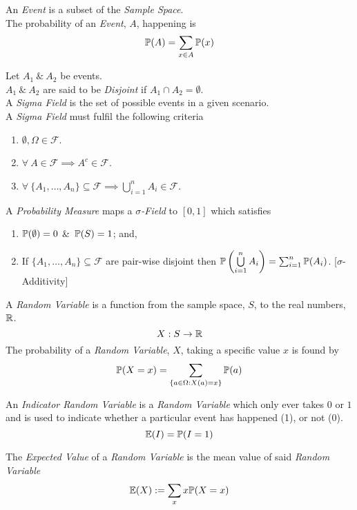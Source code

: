 \documentclass[11pt,a4paper]{article}
\begin{document}
An \textit{Event} is a subset of the \textit{Sample Space}.\\
The probability of an \textit{Event}, $A$, happening is
$$\mathbb{P}(A)=\sum_{x\in A}\mathbb{P}(x)$$

Let $A_1\ \&\ A_2$ be events.\\
$A_1\ \&\ A_2$ are said to be \textit{Disjoint} if $A_1\cap A_2=\emptyset$.\\

A \textit{Sigma Field} is the set of possible events in a given scenario.\\
A \textit{Sigma Field} must fulfil the following criteria
\begin{enumerate}
	\item $\emptyset,\Omega\in\mathcal{F}$.
	\item $\forall\ A\in\mathcal{F}\implies A^c\in\mathcal{F}$.
	\item $\forall\ \{A_1,\dots,A_n\}\subseteq\mathcal{F}\implies\bigcup\limits_{i=1}^nA_i\in\mathcal{F}$.
\end{enumerate}

A \textit{Probability Measure} maps a \textit{$\sigma$-Field} to $[0,1]$ which satisfies
\begin{enumerate}
	\item $\mathbb{P}(\emptyset)=0$ \&\ $\mathbb{P}(S)=1$; and,
	\item If $\{A_1,\dots,A_n\}\subseteq\mathcal{F}$ are pair-wise disjoint then $\mathbb{P}\left(\bigcup\limits_{i=1}^nA_i\right)=\sum_{i=1}^n\mathbb{P}(A_i)$. [$\sigma$-Additivity]
\end{enumerate}

A \textit{Random Variable} is a function from the sample space, $S$, to the real numbers, $\mathbb{R}$.\\
$$X:S\to\mathbb{R}$$
The probability of a \textit{Random Variable}, $X$, taking a specific value $x$ is found by
$$\mathbb{P}(X=x)=\sum_{\{a\in \Omega:X(a)=x\}}\mathbb{P}(a)$$

An \textit{Indicator Random Variable} is a \textit{Random Variable} which only ever takes $0$ or $1$ and is used to indicate whether a particular event has happened (1), or not (0).
$$\mathbb{E}(I)=\mathbb{P}(I=1)$$

The \textit{Expected Value} of a \textit{Random Variable} is the mean value of said \textit{Random Variable}
$$\mathbb{E}(X):=\sum_x x\mathbb{P}(X=x)$$
\end{document}
